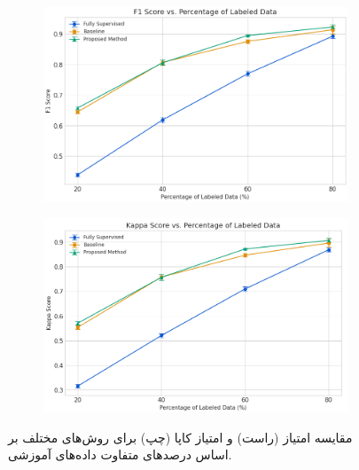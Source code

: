 \begin{figure}[ht!]
    \centering
    \begin{subfigure}[b]{0.49\textwidth}
        \includegraphics[width=\textwidth]{Images/Chapter4/main-results-f1.png}
    \end{subfigure}
    \hfill %
    \begin{subfigure}[b]{0.49\textwidth}
        \includegraphics[width=\textwidth]{Images/Chapter4/main-results-kappa.png}
    \end{subfigure}
    \caption{مقایسه امتیاز  (راست) و امتیاز کاپا (چپ) برای روش‌های مختلف بر اساس درصدهای متفاوت داده‌های آموزشی.}
    \label{fig:main-results}
\end{figure}
